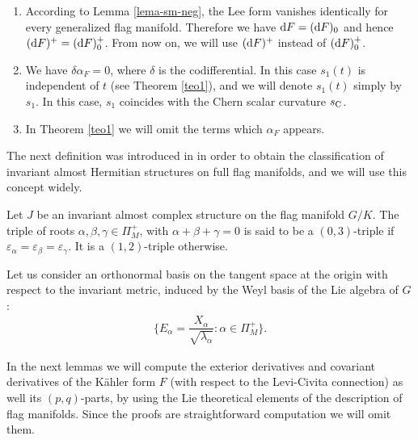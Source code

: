 \documentclass[10pt,a4paper]{amsart}
\numberwithin{equation}{section}
\begin{document}
{\samepage\begin{Remark}\quad
\begin{enumerate}\itemsep=0pt
\item[1.] According to Lemma \ref{lema-sm-neg}, the Lee form vanishes identically for every generalized flag manifold. Therefore we have ${\rm d}F=({\rm d}F)_{0}$ and hence $({\rm d}F)^{+}=({\rm d}F)_{0}^{+}$. From now on, we will use $({\rm d}F)^{+}$ instead of $({\rm d}F)_{0}^{+}$.

\item[2.] We have $\delta \alpha_{F}=0$, where $\delta$ is the codifferential. In this case $s_{1}(t)$ is independent of $t$ (see Theorem \ref{teo1}), and we will denote $s_{1}(t)$ simply by $s_{1}$. In this case, $s_1$ coincides with the Chern scalar curvature $s_{\rm C}$.

\item[3.] In Theorem \ref{teo1} we will omit the terms which $\alpha_{F}$ appears.
\end{enumerate}
\end{Remark}

}

The next definition was introduced in \cite{sn} in order to obtain the classification of invariant almost Hermitian structures on full flag manifolds, and we will use this concept widely.

\begin{Definition}
Let $J$ be an invariant almost complex structure on the flag manifold $G/K$. The triple of roots $\alpha, \beta, \gamma\in \Pi^+_M$, with $\alpha+\beta+\gamma=0$ is said to be a $(0,3)$-triple if $\varepsilon_\alpha=\varepsilon_\beta=\varepsilon_\gamma$. It is a $(1,2)$-triple otherwise.
\end{Definition}

Let us consider an orthonormal basis on the tangent space at the origin with respect to the invariant metric, induced by the Weyl basis of the Lie algebra of $G$:
\begin{gather*}
\bigg\{E_{\alpha}=\dfrac{X_{\alpha}}{\sqrt{\lambda_{\alpha}}}\colon \alpha\in \Pi_{M}^{+}\bigg\}.
\end{gather*}

In the next lemmas we will compute the exterior derivatives and covariant derivatives of the K\"ahler form $F$ (with respect to the Levi-Civita connection) as well its $(p,q)$-parts, by using the Lie theoretical elements of the description of flag manifolds. Since the proofs are straightforward computation we will omit them.
\end{document}
